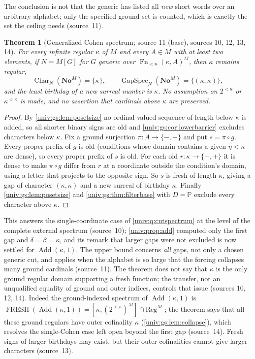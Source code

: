 \documentclass[11pt,letterpaper]{article}
\numberwithin{equation}{section}
\newtheorem{theorem}{Theorem}[section]
\theoremstyle{definition}
\theoremstyle{remark}
\newcommand{\No}{\mathbf{No}}
\newcommand{\NoM}{\No^{M}}
\newcommand{\GapSpec}{\operatorname{GapSpec}}
\newcommand{\Add}{\operatorname{Add}}
\newcommand{\Char}{\operatorname{Char}}
\newcommand{\FRESH}{\operatorname{FRESH}}
\newcommand{\Reg}{\mathrm{Reg}}
\newcommand{\Fn}{\operatorname{Fn}}
\begin{document}
The conclusion is not that the generic has listed all \emph{new} short words over
an arbitrary alphabet; only the specified ground set is counted, which is exactly
the set the ceiling needs (source~11).

\begin{theorem}[Generalized Cohen spectrum; source 11 (base), sources 10, 12, 13, 14]\label{univ:gs:thm:cohen}
For every infinite regular $\kappa$ of $M$ and every $A\in M$ with at least two
elements, if $N=M[G]$ for $G$ generic over $\Fn_{<\kappa}(\kappa,A)^M$, then
$\kappa$ remains regular,
\[
 \Char_N(\NoM)=\{\kappa\},\qquad \GapSpec_N(\NoM)=\{(\kappa,\kappa)\},
\]
and the least birthday of a new surreal number is $\kappa$. No assumption on
$2^{<\kappa}$ or $\kappa^{<\kappa}$ is made, and no assertion that cardinals above
$\kappa$ are preserved.
\end{theorem}
\begin{proof}
By \cref{univ:gs:lem:posetsize} no ordinal-valued sequence of length below
$\kappa$ is added, so all shorter binary signs are old and
\cref{univ:gs:cor:lowerbarrier} excludes characters below $\kappa$. Fix a ground
surjection $\pi:A\to\{-,+\}$ and put $s=\pi\circ g$. Every proper prefix of $g$ is
old (conditions whose domain contains a given $\eta<\kappa$ are dense), so every
proper prefix of $s$ is old. For each old $r:\kappa\to\{-,+\}$ it is dense to make
$\pi\circ g$ differ from $r$ at a coordinate outside the condition's domain, using
a letter that projects to the opposite sign. So $s$ is fresh of length $\kappa$,
giving a gap of character $(\kappa,\kappa)$ and a new surreal of birthday $\kappa$.
Finally \cref{univ:gs:lem:posetsize} and \cref{univ:gs:thm:filterbase} with
$D=\mathbb P$ exclude every character above $\kappa$.
\end{proof}

This answers the single-coordinate case of \cref{univ:q:cutspectrum} at the level
of the complete external spectrum (source~10); \cref{univ:prop:add} computed only
the first gap and $\delta=\beta=\kappa$, and its remark that larger gaps were not
excluded is now settled for $\Add(\kappa,1)$. The upper bound concerns \emph{all}
gaps, not only a chosen generic cut, and applies when the alphabet is so large that
the forcing collapses many ground cardinals (source~11). The theorem does not say
that $\kappa$ is the only ground regular domain supporting a fresh function; the
transfer, not an unqualified equality of ground and outer indices, controls that
issue (sources 10, 12, 14). Indeed the ground-indexed spectrum of $\Add(\kappa,1)$
is $\FRESH(\Add(\kappa,1))=[\kappa,(2^{<\kappa})^M]\cap\Reg^M$
\cite[Proposition~6.1]{FKW}; the theorem says that all these ground regulars have
outer cofinality $\kappa$ (\cref{univ:gs:lem:collapse}), which resolves the
single-Cohen case left open beyond the first gap (source~14). Fresh signs of larger
birthdays may exist, but their outer cofinalities cannot give larger characters
(source~13).
\end{document}
